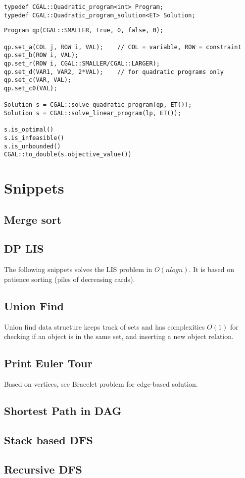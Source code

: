 \documentclass[11pt]{article}
\newcommand{\includecode}[1]{
    }
\let\stdsection\section
\renewcommand\section{\newpage\stdsection}
\begin{document}
\begin{lstlisting}
typedef CGAL::Quadratic_program<int> Program;
typedef CGAL::Quadratic_program_solution<ET> Solution;
\end{lstlisting}

\begin{lstlisting}
Program qp(CGAL::SMALLER, true, 0, false, 0);

qp.set_a(COL j, ROW i, VAL);    // COL = variable, ROW = constraint
qp.set_b(ROW i, VAL);
qp.set_r(ROW i, CGAL::SMALLER/CGAL::LARGER);
qp.set_d(VAR1, VAR2, 2*VAL);    // for quadratic programs only
qp.set_c(VAR, VAL);
qp.set_c0(VAL);

Solution s = CGAL::solve_quadratic_program(qp, ET());
Solution s = CGAL::solve_linear_program(lp, ET());

s.is_optimal()
s.is_infeasible()
s.is_unbounded()
CGAL::to_double(s.objective_value())
\end{lstlisting}


\section{Snippets}

\subsection{Merge sort}
\includecode{../snippets/MergeSort.cpp}

\subsection{DP LIS}
\includecode{../snippets/LIS_Iterative.cpp}
\includecode{../snippets/LIS_recursive.cpp}

The following snippets solves the LIS problem in $O(n log n)$. It is based on patience sorting (piles of decreasing cards).
\includecode{../snippets/LIS_greedy.cpp}

\subsection{Union Find}
Union find data structure keeps track of sets and has complexities $O(1)$ for checking if an object is in the same set, and inserting a new object relation. 
\includecode{../snippets/UnionFind.cpp}

\subsection{Print Euler Tour}
Based on vertices, see Bracelet problem for edge-based solution.
\includecode{../snippets/EulerianCycle.cpp}

\subsection{Shortest Path in DAG}
\includecode{../snippets/DAG_SSSP.cpp}

\subsection{Stack based DFS}
\includecode{../snippets/DFS_iterative.cpp}

\subsection{Recursive DFS}
\includecode{../snippets/DFS_recursive.cpp}
\end{document}
